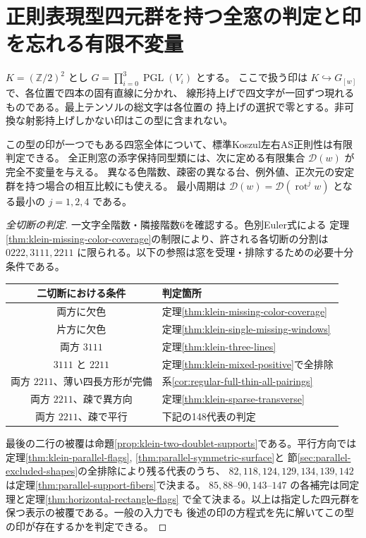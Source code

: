 \section{正則表現型四元群を持つ全窓の判定と印を忘れる有限不変量}
\label{sec:klein-unmarked-atlas}
$K=(\mathbb Z/2)^2$ とし $G=\prod_{i=0}^3\operatorname{PGL}(V_i)$ とする。
ここで扱う印は $K\hookrightarrow G_{[w]}$ で、各位置で四本の固有直線に分かれ、
線形持上げで四文字が一回ずつ現れるものである。最上テンソルの総文字は各位置の
持上げの選択で零とする。非可換な射影持上げしかない印はこの型に含まれない。
\begin{theorem}\label{thm:klein-unmarked-atlas}
この型の印が一つでもある四窓全体について、標準Koszul左右AS正則性は有限判定できる。
全正則窓の添字保持同型類には、次に定める有限集合 $\mathcal D(w)$ が完全不変量を与える。
異なる色階数、疎密の異なる台、例外値、正次元の安定群を持つ場合の相互比較にも使える。
最小周期は $\mathcal D(w)=\mathcal D(\operatorname{rot}^j w)$ となる最小の $j=1,2,4$ である。
\end{theorem}
\begin{proof}[全切断の判定]
一文字全階数・隣接階数6を確認する。色別Euler式による
定理\ref{thm:klein-missing-color-coverage}の制限により、許される各切断の分割は
$0222,3111,2211$ に限られる。以下の参照は窓を受理・排除するための必要十分条件である。
\begin{center}
\begin{tabular}{c|l}
二切断における条件 & 判定箇所\\\hline
両方に欠色 & 定理\ref{thm:klein-missing-color-coverage}\\
片方に欠色 & 定理\ref{thm:klein-single-missing-windows}\\
両方 $3111$ & 定理\ref{thm:klein-three-lines}\\
$3111$ と $2211$ & 定理\ref{thm:klein-mixed-positive}で全排除\\
両方 $2211$、薄い四長方形が完備 & 系\ref{cor:regular-full-thin-all-pairings}\\
両方 $2211$、疎で異方向 & 定理\ref{thm:klein-sparse-transverse}\\
両方 $2211$、疎で平行 & 下記の148代表の判定
\end{tabular}
\end{center}
最後の二行の被覆は命題\ref{prop:klein-two-doublet-supports}である。平行方向では
定理\ref{thm:klein-parallel-flags}, \ref{thm:parallel-symmetric-surface}と
節\ref{sec:parallel-excluded-shapes}の全排除により残る代表のうち、
$82,118,124,129,134,139,142$ は定理\ref{thm:parallel-support-fibers}で決まる。
$85,88$--$90,143$--$147$ の各補完は同定理と定理\ref{thm:horizontal-rectangle-flags}
で全て決まる。以上は指定した四元群を保つ表示の被覆である。一般の入力でも
後述の印の方程式を先に解いてこの型の印が存在するかを判定できる。
\end{proof}

